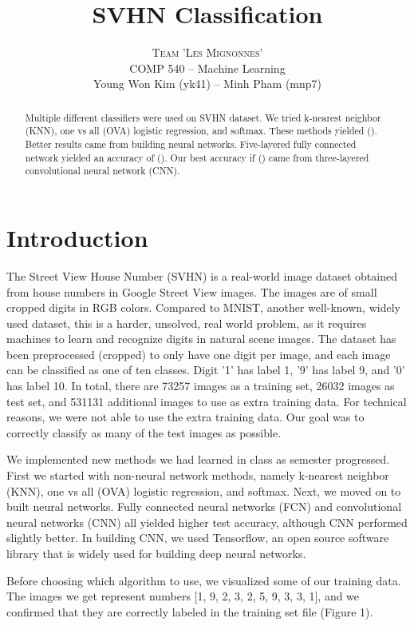 \documentclass[12pt]{article}
\title{\vspace{-15mm}\fontsize{24pt}{10pt}\selectfont\textbf{SVHN Classification}} %
\author{
	\large
	\textsc{Team 'Les Mignonnes'}\\[2mm] %
	\normalsize COMP 540 -- Machine Learning \\ %
	\normalsize Young Won Kim (yk41) -- Minh Pham (mnp7) %
	\vspace{-5mm}
}
\begin{document}
\maketitle

\hrulefill

\begin{abstract}
	\noindent Multiple different classifiers were used on SVHN dataset. We tried k-nearest neighbor (KNN), one vs all (OVA) logistic regression, and softmax. These methods yielded (). Better results came from building neural networks. Five-layered fully connected network yielded an accuracy of (). Our best accuracy if () came from three-layered convolutional neural network (CNN). 
\end{abstract}

\hrulefill

\section{Introduction}
\indent \indent The Street View House Number (SVHN) is a real-world image dataset obtained from house numbers in Google Street View images. The images are of small cropped digits in RGB colors. Compared to MNIST, another well-known, widely used dataset, this is a harder, unsolved, real world problem, as it requires machines to learn and recognize digits in natural scene images. The dataset has been preprocessed (cropped) to only have one digit per image, and each image can be classified as one of ten classes. Digit '1' has label 1, '9' has label 9, and '0' has label 10. In total, there are 73257 images as a training set, 26032 images as test set, and 531131 additional images to use as extra training data. For technical reasons, we were not able to use the extra training data. Our goal was to correctly classify as many of the test images as possible. 

\indent We implemented new methods we had learned in class as semester progressed. First we started with non-neural network methods, namely k-nearest neighbor (KNN), one vs all (OVA) logistic regression, and softmax. Next, we moved on to built neural networks. Fully connected neural networks (FCN) and convolutional neural networks (CNN) all yielded higher test accuracy, although CNN performed slightly better. In building CNN, we used Tensorflow, an open source software library that is widely used for building deep neural networks. 

\indent Before choosing which algorithm to use, we visualized some of our training data. The images we get represent numbers [1, 9, 2, 3, 2, 5, 9, 3, 3, 1], and we confirmed that they are correctly labeled in the training set file (Figure 1). 
\end{document}
